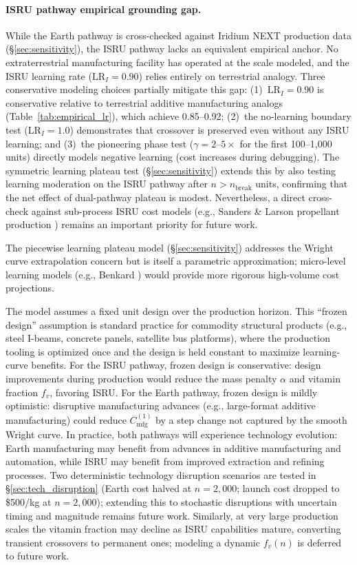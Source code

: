 \documentclass[preprint,12pt]{elsarticle}
\begin{document}
\paragraph{ISRU pathway empirical grounding gap.} While the Earth pathway is cross-checked against Iridium NEXT production data (\S\ref{sec:sensitivity}), the ISRU pathway lacks an equivalent empirical anchor. No extraterrestrial manufacturing facility has operated at the scale modeled, and the ISRU learning rate ($\mathrm{LR}_I = 0.90$) relies entirely on terrestrial analogy. Three conservative modeling choices partially mitigate this gap: (1)~$\mathrm{LR}_I = 0.90$ is conservative relative to terrestrial additive manufacturing analogs (Table~\ref{tab:empirical_lr}), which achieve 0.85--0.92; (2)~the no-learning boundary test ($\mathrm{LR}_I = 1.0$) demonstrates that crossover is preserved even without any ISRU learning; and (3)~the pioneering phase test ($\gamma = 2$--$5\times$ for the first 100--1{,}000 units) directly models negative learning (cost increases during debugging). The symmetric learning plateau test (\S\ref{sec:sensitivity}) extends this by also testing learning moderation on the ISRU pathway after $n > n_{\mathrm{break}}$ units, confirming that the net effect of dual-pathway plateau is modest. Nevertheless, a direct cross-check against sub-process ISRU cost models (e.g., Sanders \& Larson propellant production \cite{sanders2015}) remains an important priority for future work.

The piecewise learning plateau model (\S\ref{sec:sensitivity}) addresses the Wright curve extrapolation concern but is itself a parametric approximation; micro-level learning models (e.g., Benkard \cite{benkard2000}) would provide more rigorous high-volume cost projections.

The model assumes a fixed unit design over the production horizon. This ``frozen design'' assumption is standard practice for commodity structural products (e.g., steel I-beams, concrete panels, satellite bus platforms), where the production tooling is optimized once and the design is held constant to maximize learning-curve benefits. For the ISRU pathway, frozen design is conservative: design improvements during production would reduce the mass penalty $\alpha$ and vitamin fraction $f_v$, favoring ISRU. For the Earth pathway, frozen design is mildly optimistic: disruptive manufacturing advances (e.g., large-format additive manufacturing) could reduce $C_{\mathrm{mfg}}^{(1)}$ by a step change not captured by the smooth Wright curve. In practice, both pathways will experience technology evolution: Earth manufacturing may benefit from advances in additive manufacturing and automation, while ISRU may benefit from improved extraction and refining processes. Two deterministic technology disruption scenarios are tested in \S\ref{sec:tech_disruption} (Earth cost halved at $n = 2{,}000$; launch cost dropped to \$500/kg at $n = 2{,}000$); extending this to stochastic disruptions with uncertain timing and magnitude remains future work. Similarly, at very large production scales the vitamin fraction may decline as ISRU capabilities mature, converting transient crossovers to permanent ones; modeling a dynamic $f_v(n)$ is deferred to future work.
\end{document}

